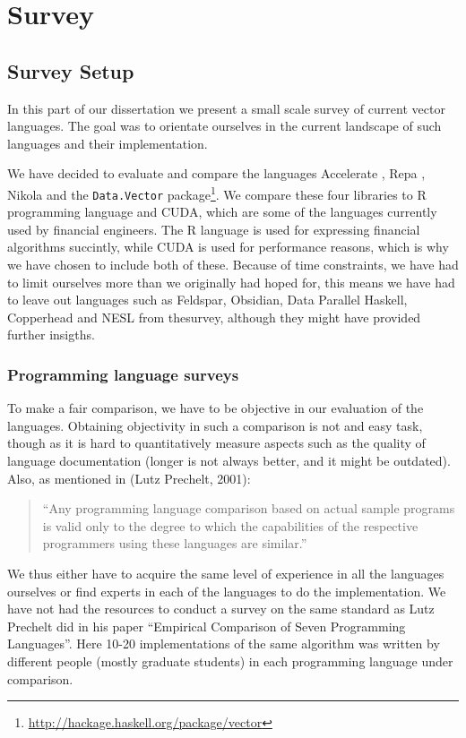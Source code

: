 \part{Survey}
\chapter{Survey Setup}
In this part of our dissertation we present a small scale survey of
current vector languages. The goal was to orientate ourselves in the
current landscape of such languages and their
implementation. 

We have decided to evaluate and compare the languages Accelerate
\cite{}, Repa \cite{}, Nikola \cite{} and the \texttt{Data.Vector}
package\footnote{\url{http://hackage.haskell.org/package/vector}}. We
compare these four libraries to R programming language \cite{} and
CUDA, which are some of the languages currently used by financial
engineers. The R language is used for expressing financial algorithms
succintly, while CUDA is used for performance reasons, which is why we
have chosen to include both of these. Because of time constraints, we
have had to limit ourselves more than we originally had hoped for,
this means we have had to leave out languages such as Feldspar\cite{},
Obsidian\cite{}, Data Parallel Haskell\cite{}, Copperhead\cite{} and
NESL\cite{} from thesurvey, although they might have provided further
insigths.

\section{Programming language surveys}
To make a fair comparison, we have to be objective in our evaluation
of the languages. Obtaining objectivity in such a comparison is not
and easy task, though as it is hard to quantitatively measure aspects
such as the quality of language documentation (longer is not always
better, and it might be outdated). Also, as mentioned in (Lutz Prechelt, 2001):

\begin{quote}
  ``Any programming language comparison based on actual sample programs
  is valid only to the degree to which the capabilities of the
  respective programmers using these languages are similar.''
\end{quote}

We thus either have to acquire the same level of experience in all the
languages ourselves or find experts in each of the languages to do the
implementation. We have not had the resources to conduct a survey on
the same standard as Lutz Prechelt did in his paper ``Empirical
Comparison of Seven Programming Languages''. Here 10-20
implementations of the same algorithm was written by different people
(mostly graduate students) in each programming language under comparison.

